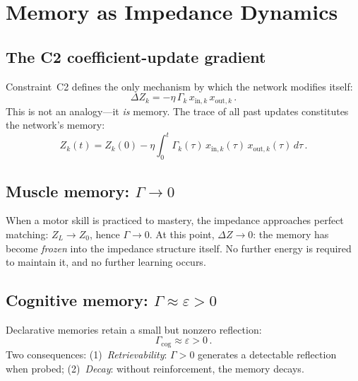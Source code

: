 \documentclass[aps,pre,twocolumn,superscriptaddress,floatfix]{revtex4-2}
\begin{document}
\section{Memory as Impedance Dynamics}
\label{sec:memory}

\subsection{The C2 coefficient-update gradient}

Constraint~C2 defines the only mechanism by which the
network modifies itself:
\begin{equation}
  \Delta Z_k = -\eta\,\Gamma_k\,x_{\text{in},k}\,x_{\text{out},k}\,.
  \label{eq:C2-update}
\end{equation}
This is not an analogy---it \emph{is} memory.
The trace of all past updates constitutes the network's
memory:
\begin{equation}
  Z_k(t) = Z_k(0) - \eta \int_0^t
    \Gamma_k(\tau)\,x_{\text{in},k}(\tau)\,
    x_{\text{out},k}(\tau)\,d\tau\,.
  \label{eq:memory-integral}
\end{equation}

\subsection{Muscle memory: $\Gamma\to 0$}

When a motor skill is practiced to mastery, the impedance
approaches perfect matching: $Z_L\to Z_0$, hence
$\Gamma\to 0$.
At this point, $\Delta Z\to 0$: the memory has become
\emph{frozen} into the impedance structure itself.
No further energy is required to maintain it, and no
further learning occurs.

\subsection{Cognitive memory: $\Gamma\approx\varepsilon>0$}

Declarative memories retain a small but nonzero
reflection:
\begin{equation}
  \Gamma_{\text{cog}} \approx \varepsilon > 0\,.
  \label{eq:cog-memory}
\end{equation}
Two consequences:
(1)~\emph{Retrievability}: $\Gamma > 0$ generates a
detectable reflection when probed;
(2)~\emph{Decay}: without reinforcement, the memory
decays.
\end{document}
